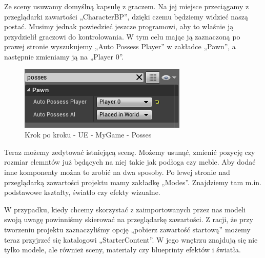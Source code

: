 \documentclass[openright]{xmgr}
\begin{document}
Ze sceny usuwamy domyślną kapsułę z graczem. Na jej miejsce przeciągamy z przeglądarki zawartości „CharacterBP”, dzięki czemu będziemy widzieć naszą postać. Musimy jednak powiedzieć jeszcze programowi, aby to właśnie ją przydzielił graczowi do kontrolowania. W tym celu mając ją zaznaczoną po prawej stronie wyszukujemy „Auto Possess Player” w zakładce „Pawn”, a następnie zmieniamy ją na „Player 0”.

\begin{figure}[!htb]
    \begin{center}
    \includegraphics[scale=0.35]{Screeny/UeKrokPoKroku/UE-MyGame-Posses.png}
    \end{center}
    \caption{Krok po kroku - UE -  MyGame - Posses}
\end{figure}

Teraz możemy zedytować istniejącą scenę. Możemy usunąć, zmienić pozycję czy rozmiar elemntów już będących na niej takie jak podłoga czy meble. Aby dodać inne komponenty można to zrobić na dwa sposoby. Po lewej stronie nad przeglądarką zawartości projektu mamy zakładkę „Modes”. Znajdziemy tam m.in. podstawowe kształty, światło czy efekty wizualne. 

W przypadku, kiedy chcemy skorzystać z zaimportowanych przez nas modeli swoją uwagę powinniśmy skierować na przeglądarkę zawartości. Z racji, że przy tworzeniu projektu zaznaczyliśmy opcję „pobierz zawartość startową” możemy teraz przyjrzeć się katalogowi „StarterContent”. W jego wnętrzu znajdują się nie tylko modele, ale również sceny, materiały czy blueprinty efektów i światła.
\end{document}
